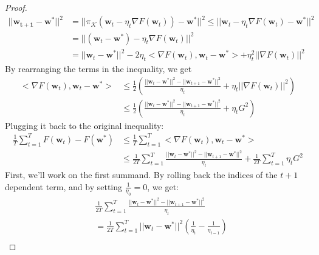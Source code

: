 \begin{proof}
    \begin{equation*}
        \begin{split}            
            ||\pmb{w_{t+1} - \pmb{w}^*}||^2 
            &= ||\pi_{\mathcal{K}}(\pmb{w}_t - \eta_t \nabla F(\pmb{w}_t)) - \pmb{w}^*||^2
            \leq ||\pmb{w}_t - \eta_t \nabla F(\pmb{w}_t) - \pmb{w}^*||^2 \\
            &= ||(\pmb{w}_t - \pmb{w}^*) - \eta_t \nabla F(\pmb{w}_t)||^2 \\
            &= ||\pmb{w}_t - \pmb{w}^*||^2 - 2\eta_t <\nabla F(\pmb{w}_t), \pmb{w}_t - \pmb{w}^*> + \eta_t^2 ||\nabla F(\pmb{w}_t)||^2
        \end{split}
    \end{equation*}
    By rearranging the terms in the inequality, we get
    \begin{equation*}
        \begin{split}            
            <\nabla F(\pmb{w}_t), \pmb{w}_t - \pmb{w}^*> &\leq \frac{1}{2} \left(\frac{||\pmb{w}_t - \pmb{w}^*||^2 - ||\pmb{w}_{t+1} - \pmb{w}^*||^2}{\eta_t} + \eta_t ||\nabla F(\pmb{w}_t)||^2\right) \\
            &\leq \frac{1}{2} \left(\frac{||\pmb{w}_t - \pmb{w}^*||^2 - ||\pmb{w}_{t+1} - \pmb{w}^*||^2}{\eta_t} + \eta_t G^2\right)
        \end{split}
    \end{equation*}
    Plugging it back to the original inequality:
    \begin{equation*}
        \begin{split}            
            \frac{1}{T} \sum_{t=1}^T F(\pmb{w}_t) - F(\pmb{w}^*) 
            &\leq \frac{1}{T} \sum_{t=1}^T <\nabla F(\pmb{w}_t), \pmb{w}_t - \pmb{w}^*> \\
            &\leq \frac{1}{2T} \sum_{t=1}^T \frac{||\pmb{w}_t - \pmb{w}^*||^2 - ||\pmb{w}_{t+1} - \pmb{w}^*||^2}{\eta_t} + \frac{1}{2T} \sum_{t=1}^T \eta_t G^2
        \end{split}
    \end{equation*}
    First, we'll work on the first summand. By rolling back the indices of the $t+1$ dependent term, and by setting $\frac{1}{\eta_0} = 0$, we get:
    \begin{equation*}
        \begin{split}
            &\frac{1}{2T} \sum_{t=1}^T \frac{||\pmb{w}_t - \pmb{w}^*||^2 - ||\pmb{w}_{t+1} - \pmb{w}^*||^2}{\eta_t} \\
            &= \frac{1}{2T} \sum_{t=1}^T ||\pmb{w}_t - \pmb{w}^*||^2 \left(\frac{1}{\eta_t} - \frac{1}{\eta_{t-1}}\right) \\

\end{split}
\end{equation*}
\end{proof}
